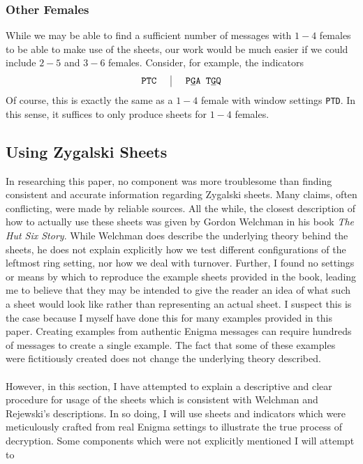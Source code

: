 \subsubsection{Other Females} While we may be able to find a
sufficient number of messages with $1-4$ females to be able to make
use of the sheets, our work would be much easier if we could include
$2-5$ and $3-6$ females. Consider, for example, the indicators
\[
	\setlength{\arraycolsep}{15pt}
	\begin{array}{c | c}
		\texttt{PTC} & \texttt{P}{\uline{\texttt{G}}}\texttt{A
			T}{\uline{\texttt{G}}}\texttt{Q}
	\end{array}
\]
Of course, this is exactly the same as a $1-4$ female with window
settings \texttt{PTD}. In this sense, it suffices to only produce
sheets for $1-4$ females.
\subsection{Using Zygalski Sheets}
In researching this paper, no component was more troublesome than
finding consistent and accurate information regarding Zygalski
sheets. Many claims, often conflicting, were made by reliable
sources. All the while, the closest description of how to actually
use these sheets was given by Gordon Welchman in his book \emph{The
	Hut Six Story}. While Welchman does describe the underlying theory
behind the sheets, he does not explain explicitly how we test
different configurations of the leftmost ring setting, nor how we
deal with turnover. Further, I found no settings or means by which to
reproduce the example sheets provided in the book, leading me to
believe that they may be intended to give the reader an idea of what
such a sheet would look like rather than representing an actual
sheet. I suspect this is the case because I myself have done this for
many examples provided in this paper. Creating examples from
authentic Enigma messages can require hundreds of messages to create
a single example. The fact that some of these examples were
fictitiously created does not change the underlying theory described.
\\\\However, in this section, I have attempted to explain a
descriptive and clear procedure for usage of the sheets which is
consistent with Welchman and Rejewski's descriptions. In so doing, I
will use sheets and indicators which were meticulously crafted from
real Enigma settings to illustrate the true process of decryption.
Some components which were not explicitly mentioned I will attempt to
